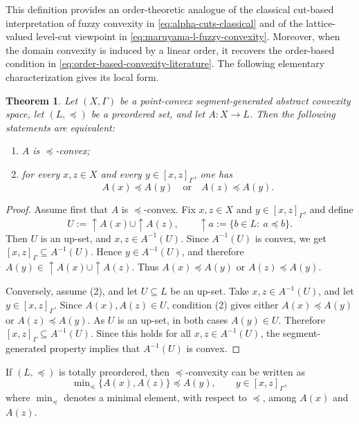 \documentclass[11pt,a4paper]{article}
\newtheorem{theorem}{Theorem}
\begin{document}


This definition provides an order-theoretic analogue of the classical cut-based interpretation of fuzzy convexity in \eqref{eq:alpha-cuts-classical} and of the lattice-valued level-cut viewpoint in \eqref{eq:maruyama-l-fuzzy-convexity}. Moreover, when the domain convexity is induced by a linear order, it recovers the order-based condition in \eqref{eq:order-based-convexity-literature}. The following elementary characterization gives its local form.


\begin{theorem}\label{teo_orden_local}
Let \((X,\Gamma)\) be a point-convex segment-generated abstract convexity space, let \((L,\preccurlyeq)\) be a preordered set, and let \(A:X\to L\). Then the following statements are equivalent:
\begin{enumerate}
    \item \(A\) is \(\preccurlyeq\)-convex;
    \item for every \(x,z\in X\) and every \(y\in[x,z]_{\Gamma}\), one has
    \[
    A(x)\preccurlyeq A(y)
    \quad\text{or}\quad
    A(z)\preccurlyeq A(y).
    \]
\end{enumerate}
\end{theorem}

\begin{proof}
Assume first that \(A\) is \(\preccurlyeq\)-convex. Fix \(x,z\in X\) and \(y\in[x,z]_{\Gamma}\), and define
\[
U:=\uparrow A(x)\cup \uparrow A(z),
\qquad
\uparrow a:=\{b\in L:\ a\preccurlyeq b\}.
\]
Then \(U\) is an up-set, and \(x,z\in A^{-1}(U)\). Since \(A^{-1}(U)\) is convex, we get \([x,z]_{\Gamma}\subseteq A^{-1}(U)\). Hence \(y\in A^{-1}(U)\), and therefore \(A(y)\in \uparrow A(x)\cup\uparrow A(z)\). Thus \(A(x)\preccurlyeq A(y)\) or \(A(z)\preccurlyeq A(y)\).

Conversely, assume (2), and let \(U\subseteq L\) be an up-set. Take \(x,z\in A^{-1}(U)\), and let \(y\in[x,z]_{\Gamma}\). Since \(A(x),A(z)\in U\), condition (2) gives either \(A(x)\preccurlyeq A(y)\) or \(A(z)\preccurlyeq A(y)\). As \(U\) is an up-set, in both cases \(A(y)\in U\). Therefore \([x,z]_{\Gamma}\subseteq A^{-1}(U)\). Since this holds for all \(x,z\in A^{-1}(U)\), the segment-generated property implies that \(A^{-1}(U)\) is convex.
\end{proof}

If \((L,\preccurlyeq)\) is totally preordered, then \(\preccurlyeq\)-convexity can be written as
\[
\min\nolimits_{\preccurlyeq}\{A(x),A(z)\}\preccurlyeq A(y),
\qquad y\in[x,z]_{\Gamma},
\]
where \(\min_{\preccurlyeq}\) denotes a minimal element, with respect to \(\preccurlyeq\), among \(A(x)\) and \(A(z)\).
\end{document}
